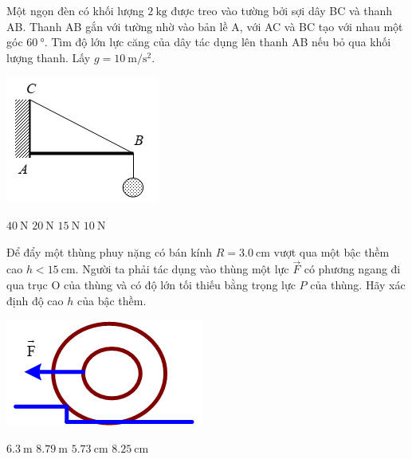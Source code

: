 \begin{ex}
Một ngọn đèn có khối lượng $\SI{2}{\kilogram}$ được treo vào tường bởi sợi dây BC và thanh AB. Thanh AB gắn với tường nhờ vào bản lề A, với AC và BC tạo với nhau một góc $\SI{60}{\degree}$. Tìm độ lớn lực căng của dây tác dụng lên thanh AB nếu bỏ qua khối lượng thanh. Lấy $g=\SI{10}{\meter/\second^2}$.
\begin{center}
	\includegraphics[width=0.25\linewidth]{../figs/VN10-2023-PH-TP0005-12}
\end{center}	
	\choice
	{\True $\SI{40}{\newton}$}
	{$\SI{20}{\newton}$}
	{$\SI{15}{\newton}$}
	{$\SI{10}{\newton}$}
\end{ex}
\begin{ex}
	Để đẩy một thùng phuy nặng có bán kính $R=\SI{3.0}{\centi\meter}$ vượt qua một bậc thềm cao $h<\SI{15}{\centi\meter}$. Người ta phải tác dụng vào thùng một lực $\vec F$ có phương ngang đi qua trục O của thùng và có độ lớn tối thiếu bằng trọng lực $P$ của thùng. Hãy xác định độ cao $h$ của bậc thềm.
	\begin{center}
		\includegraphics[width=0.25\linewidth]{../figs/VN10-2023-PH-TP0005-10}
	\end{center}
	\choice
	{$\SI{6.3}{\meter}$}
	{\True $\SI{8.79}{\meter}$}
	{$\SI{5.73}{\centi\meter}$}
	{$\SI{8.25}{\centi\meter}$}
\end{ex}

